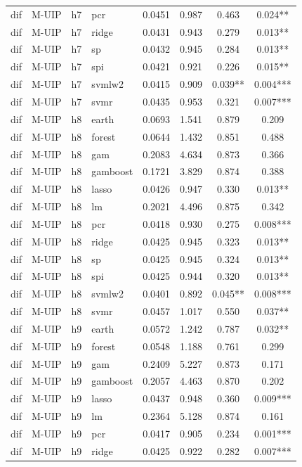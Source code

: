 \begin{ThreePartTable}
\begin{longtable}[t]{llclcccc}
dif & M-UIP & h7 & pcr & 0.0451 & 0.987 & 0.463 & 0.024**\\
dif & M-UIP & h7 & ridge & 0.0431 & 0.943 & 0.279 & 0.013**\\
dif & M-UIP & h7 & sp & 0.0432 & 0.945 & 0.284 & 0.013**\\
dif & M-UIP & h7 & spi & 0.0421 & 0.921 & 0.226 & 0.015**\\
dif & M-UIP & h7 & svmlw2 & 0.0415 & 0.909 & 0.039** & 0.004***\\
dif & M-UIP & h7 & svmr & 0.0435 & 0.953 & 0.321 & 0.007***\\
\addlinespace
dif & M-UIP & h8 & earth & 0.0693 & 1.541 & 0.879 & 0.209\\
dif & M-UIP & h8 & forest & 0.0644 & 1.432 & 0.851 & 0.488\\
dif & M-UIP & h8 & gam & 0.2083 & 4.634 & 0.873 & 0.366\\
dif & M-UIP & h8 & gamboost & 0.1721 & 3.829 & 0.874 & 0.388\\
dif & M-UIP & h8 & lasso & 0.0426 & 0.947 & 0.330 & 0.013**\\
dif & M-UIP & h8 & lm & 0.2021 & 4.496 & 0.875 & 0.342\\
dif & M-UIP & h8 & pcr & 0.0418 & 0.930 & 0.275 & 0.008***\\
dif & M-UIP & h8 & ridge & 0.0425 & 0.945 & 0.323 & 0.013**\\
dif & M-UIP & h8 & sp & 0.0425 & 0.945 & 0.324 & 0.013**\\
dif & M-UIP & h8 & spi & 0.0425 & 0.944 & 0.320 & 0.013**\\
dif & M-UIP & h8 & svmlw2 & 0.0401 & 0.892 & 0.045** & 0.008***\\
dif & M-UIP & h8 & svmr & 0.0457 & 1.017 & 0.550 & 0.037**\\
\addlinespace
dif & M-UIP & h9 & earth & 0.0572 & 1.242 & 0.787 & 0.032**\\
dif & M-UIP & h9 & forest & 0.0548 & 1.188 & 0.761 & 0.299\\
dif & M-UIP & h9 & gam & 0.2409 & 5.227 & 0.873 & 0.171\\
dif & M-UIP & h9 & gamboost & 0.2057 & 4.463 & 0.870 & 0.202\\
dif & M-UIP & h9 & lasso & 0.0437 & 0.948 & 0.360 & 0.009***\\
dif & M-UIP & h9 & lm & 0.2364 & 5.128 & 0.874 & 0.161\\
dif & M-UIP & h9 & pcr & 0.0417 & 0.905 & 0.234 & 0.001***\\
dif & M-UIP & h9 & ridge & 0.0425 & 0.922 & 0.282 & 0.007***\\

\end{longtable}
\end{ThreePartTable}
